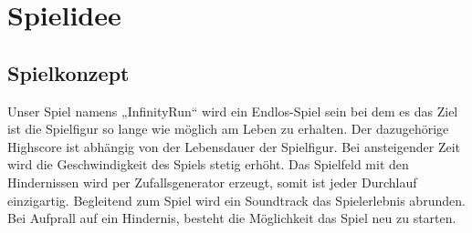 \section{Spielidee}
\subsection{Spielkonzept}
Unser Spiel namens „InfinityRun“ wird ein Endlos-Spiel sein bei dem es das Ziel ist die Spielfigur so lange wie möglich am Leben zu erhalten. Der dazugehörige Highscore ist abhängig von der Lebensdauer der Spielfigur. Bei ansteigender Zeit wird die Geschwindigkeit des Spiels stetig erhöht. Das Spielfeld mit den Hindernissen wird per Zufallsgenerator erzeugt, somit ist jeder Durchlauf einzigartig. Begleitend zum Spiel wird ein Soundtrack das Spielerlebnis abrunden. Bei Aufprall auf ein Hindernis, besteht die Möglichkeit das Spiel neu zu starten.
\newpage
